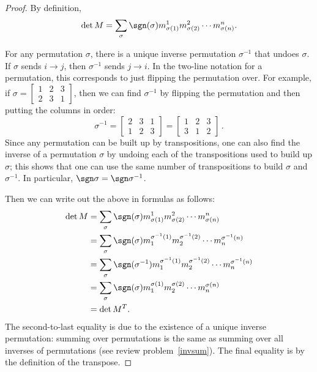 \begin{proof}
  By definition, \[
\det M = \sum_{\sigma} \sgn (\sigma) m^1_{\sigma(1)}m^2_{\sigma(2)}\cdots m^n_{\sigma(n)}.
\]

For any permutation $\sigma$, there is a unique inverse permutation $\sigma^{-1}$ that undoes $\sigma$.  If $\sigma$ sends $i\rightarrow j$, then $\sigma^{-1}$ sends $j\rightarrow i$.  In the two-line notation for a permutation, this corresponds to just flipping the permutation over.  For example, if $\sigma=\begin{bmatrix} 
1 & 2 & 3 \\
2 & 3 & 1
\end{bmatrix}$, then we can find $\sigma^{-1}$ by flipping the permutation and then putting the columns in order:
\[
\sigma^{-1}=\begin{bmatrix} 
2 & 3 & 1 \\
1 & 2 & 3
\end{bmatrix}=\begin{bmatrix} 
1 & 2 & 3 \\
3 & 1 & 2
\end{bmatrix}\, .
\]
Since any permutation can be built up by transpositions, one can also find the inverse of a permutation $\sigma$ by undoing each of the transpositions used to build up $\sigma$; this shows that one can use the same number of transpositions to build $\sigma$ and $\sigma^{-1}$.  In particular, $\sgn \sigma= \sgn \sigma^{-1}$.


Then we can write out the above in formulas as follows:
\begin{align*}
\det M &=\sum_{\sigma} \sgn (\sigma) m^1_{\sigma(1)}m^2_{\sigma(2)}\cdots m^n_{\sigma(n)} \\
&=\sum_{\sigma} \sgn (\sigma) m_1^{\sigma^{-1}(1)}m_2^{\sigma^{-1}(2)}\cdots m_n^{\sigma^{-1}(n)} \\
&=\sum_{\sigma} \sgn (\sigma^{-1}) m_1^{\sigma^{-1}(1)}m_2^{\sigma^{-1}(2)}\cdots m_n^{\sigma^{-1}(n)} \\
&=\sum_{\sigma} \sgn (\sigma) m_1^{\sigma(1)}m_2^{\sigma(2)}\cdots m_n^{\sigma(n)} \\
&=\det M^T.
\end{align*}
The second-to-last equality is due to the existence of a unique inverse permutation: summing over permutations is the same as summing over all inverses of permutations (see review problem~\ref{invsum}).  The final equality is by the definition of the transpose.
\end{proof}

